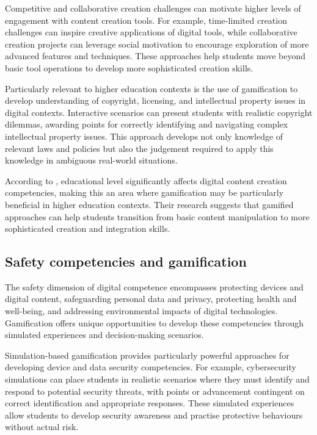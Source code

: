 \documentclass[cte]{acnsart}
\begin{document}
Competitive and collaborative creation challenges can motivate higher levels of engagement with content creation tools. For example, time-limited creation challenges can inspire creative applications of digital tools, while collaborative creation projects can leverage social motivation to encourage exploration of more advanced features and techniques. These approaches help students move beyond basic tool operations to develop more sophisticated creation skills.

Particularly relevant to higher education contexts is the use of gamification to develop understanding of copyright, licensing, and intellectual property issues in digital contexts. Interactive scenarios can present students with realistic copyright dilemmas, awarding points for correctly identifying and navigating complex intellectual property issues. This approach develops not only knowledge of relevant laws and policies but also the judgement required to apply this knowledge in ambiguous real-world situations.

According to \citet{Barboutidis2023613}, educational level significantly affects digital content creation competencies, making this an area where gamification may be particularly beneficial in higher education contexts. Their research suggests that gamified approaches can help students transition from basic content manipulation to more sophisticated creation and integration skills.

\subsection{Safety competencies and gamification}

The safety dimension of digital competence encompasses protecting devices and digital content, safeguarding personal data and privacy, protecting health and well-being, and addressing environmental impacts of digital technologies. Gamification offers unique opportunities to develop these competencies through simulated experiences and decision-making scenarios.

Simulation-based gamification provides particularly powerful approaches for developing device and data security competencies. For example, cybersecurity simulations can place students in realistic scenarios where they must identify and respond to potential security threats, with points or advancement contingent on correct identification and appropriate responses. These simulated experiences allow students to develop security awareness and practise protective behaviours without actual risk.
\end{document}

